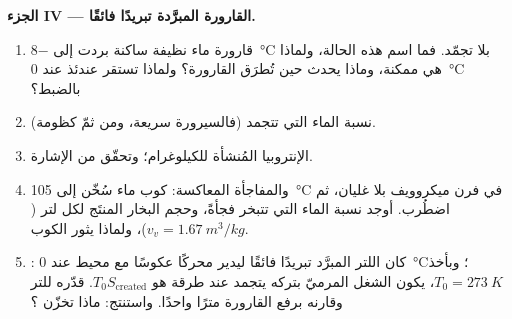 \begin{problem}
\medskip
\noindent\textbf{الجزء IV --- القارورة المبرَّدة تبريدًا فائقًا.}
\begin{enumerate}[resume]
  \item قارورة ماء نظيفة ساكنة بردت إلى \qty{-8}{\degreeCelsius}
        بلا تجمّد. فما اسم هذه الحالة، ولماذا هي ممكنة،
        وماذا يحدث حين تُطرَق القارورة؟ ولماذا تستقر  عندئذ عند \qty{0}{\degreeCelsius} بالضبط؟
  \item نسبة الماء التي تتجمد (فالسيرورة سريعة، ومن ثمّ
        كظومة).
  \item الإنتروبيا المُنشأة للكيلوغرام؛ وتحقّق من الإشارة.
  \item والمفاجأة المعاكسة: كوب ماء سُخّن إلى \qty{105}{\degreeCelsius}
        في فرن ميكروويف بلا غليان، ثم اضطُرب. أوجد نسبة
        الماء التي تتبخر فجأةً، وحجم البخار المنتَج لكل
        لتر ($v_v = \qty{1.67}{m^3/kg}$)، ولماذا يثور الكوب.
  \item {}: كان اللتر المبرَّد تبريدًا فائقًا ليدير
        محركًا عكوسًا مع محيط عند \qty{0}{\degreeCelsius}؛ وبأخذ
        $T_0 = \qty{273}{K}$، يكون الشغل المرميّ بتركه يتجمد عند
        طرقة هو $T_0S_{\mathrm{created}}$. قدّره للتر
        وقارنه برفع القارورة مترًا واحدًا. واستنتج: ماذا
        تخزّن ؟
\end{enumerate}
\end{problem}
